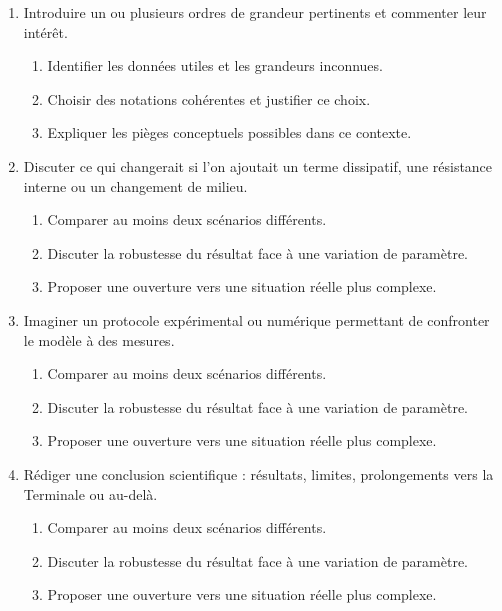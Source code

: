 \documentclass[11pt,a4paper]{article}
\begin{document}
\begin{enumerate}[label=\textbf{Très long \arabic*.},leftmargin=*]
\begin{enumerate}[label=\textbf{\arabic*)}]
\begin{enumerate}[label=\alph*)]
\item Préciser quelles grandeurs sont supposées constantes et lesquelles peuvent varier.
\item Interpréter physiquement chaque terme.
\end{enumerate}
\item Introduire un ou plusieurs ordres de grandeur pertinents et commenter leur intérêt.
\begin{enumerate}[label=\alph*)]
\item Identifier les données utiles et les grandeurs inconnues.
\item Choisir des notations cohérentes et justifier ce choix.
\item Expliquer les pièges conceptuels possibles dans ce contexte.
\end{enumerate}
\item Discuter ce qui changerait si l'on ajoutait un terme dissipatif, une résistance interne ou un changement de milieu.
\begin{enumerate}[label=\alph*)]
\item Comparer au moins deux scénarios différents.
\item Discuter la robustesse du résultat face à une variation de paramètre.
\item Proposer une ouverture vers une situation réelle plus complexe.
\end{enumerate}
\item Imaginer un protocole expérimental ou numérique permettant de confronter le modèle à des mesures.
\begin{enumerate}[label=\alph*)]
\item Comparer au moins deux scénarios différents.
\item Discuter la robustesse du résultat face à une variation de paramètre.
\item Proposer une ouverture vers une situation réelle plus complexe.
\end{enumerate}
\item Rédiger une conclusion scientifique : résultats, limites, prolongements vers la Terminale ou au-delà.
\begin{enumerate}[label=\alph*)]
\item Comparer au moins deux scénarios différents.
\item Discuter la robustesse du résultat face à une variation de paramètre.
\item Proposer une ouverture vers une situation réelle plus complexe.
\end{enumerate}

\end{enumerate}
\end{enumerate}
\end{document}
